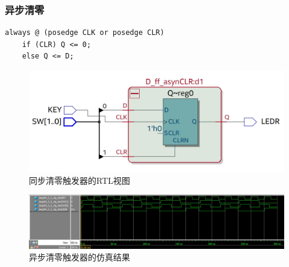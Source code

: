 \documentclass[12pt,a4paper,UTF8]{article}
\begin{document}
\subsubsection{异步清零}
\begin{lstlisting}[style=verilog-style]
always @ (posedge CLK or posedge CLR)
	if (CLR) Q <= 0;
	else Q <= D;
\end{lstlisting}
\begin{figure}[H]
  \centering
  \includegraphics[width=1\textwidth]{rtl_asynCLR.JPG}
  \caption{同步清零触发器的RTL视图}
  \label{rtl_asynCLR}
\end{figure}
\begin{figure}[H]
  \centering
  \includegraphics[width=1\textwidth]{sim_asynCLR.JPG}
  \caption{异步清零触发器的仿真结果}
  \label{sim_asynCLR}
\end{figure}
\end{document}
